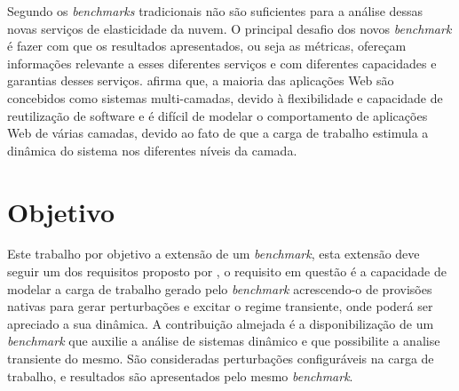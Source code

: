 Segundo \cite{Binnig2009} os \textit{benchmarks} tradicionais não são suficientes para a análise dessas novas serviços de elasticidade da nuvem. O principal desafio dos novos \textit{benchmark} é fazer com que os resultados apresentados, ou seja as métricas, ofereçam informações relevante a esses diferentes serviços e com diferentes capacidades e garantias desses serviços. \cite{Dong2014} afirma que, a maioria das aplicações Web são concebidos como sistemas multi-camadas, devido à flexibilidade e capacidade de reutilização de software e é difícil de modelar o comportamento de aplicações Web de várias camadas, devido ao fato de que a carga de trabalho estimula a dinâmica do sistema nos diferentes níveis da camada.


\section{Objetivo}
Este trabalho por objetivo a extensão de um \textit{benchmark}, esta extensão deve seguir um dos requisitos proposto por \cite{Lourenco2015}, o requisito em questão é a capacidade de modelar a carga de trabalho gerado pelo \textit{benchmark} acrescendo-o de provisões nativas para gerar perturbações e excitar o regime transiente, onde poderá ser apreciado a sua dinâmica.  A contribuição almejada é a disponibilização de um \textit{benchmark} que auxilie a análise de sistemas dinâmico e que possibilite a analise transiente do mesmo. São consideradas perturbações configuráveis na carga de trabalho, e resultados são apresentados pelo mesmo \textit{benchmark}.
